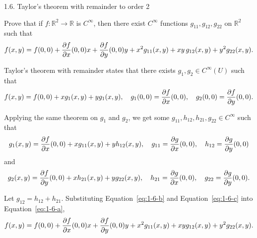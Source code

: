 \begin{problem}{1.6. Taylor's theorem with remainder to order 2}

Prove that if \( f : \mathbb{R}^2 \to \mathbb{R} \) is \( C^\infty \), then there exist \( C^\infty \) functions \( g_{11}, g_{12}, g_{22} \) on \( \mathbb{R}^2 \) such that
\[
    f(x, y) = f(0,0) + \frac{\partial f}{\partial x}(0,0) x + \frac{\partial f}{\partial y}(0,0) y + x^2 g_{11}(x, y) + xy\, g_{12}\/(x, y) + y^2 g_{22}\/(x, y).
\]
\end{problem}

Taylor's theorem with remainder states that there exists $g_1, g_2 \in C^{\infty} (U)$ such that 
\begin{equation} \label{eq:1-6-a}
    f(x, y) = f(0, 0) + xg_1(x, y) + yg_1(x, y), \quad g_1(0, 0) = \pdv{f}{x}\/(0, 0), \quad g_2\/(0, 0) = \pdv{f}{y}\/(0, 0) .
\end{equation}

Applying the same theorem on $g_1$ and $g_2$, we get some $g_{11}, h_{12}, h_{21}, g_{22} \in C^{\infty}$ such that
\begin{equation} \label{eq:1-6-b}
    g_1(x, y) = \pdv{f}{x}\/(0, 0) + xg_{11}(x,y) + yh_{12}(x, y), \quad g_{11} = \pdv{g}{x} \/(0, 0), \quad h_{12} = \pdv{g}{y} \/(0, 0)
\end{equation}
and
\begin{equation} \label{eq:1-6-c}
    g_2(x, y) = \pdv{f}{y}\/(0, 0) + xh_{21}(x,y) + yg_{22}(x, y), \quad h_{21} = \pdv{g}{x} \/(0, 0), \quad g_{22} = \pdv{g}{y} \/(0, 0) .
\end{equation}

Let $g_{12} = h_{12} + h_{21}$.
Substituting Equation~\ref{eq:1-6-b} and Equation~\ref{eq:1-6-c} into Equation~\ref{eq:1-6-a}, 
\begin{equation}
    f(x, y) = f(0, 0) + \pdv{f}{x}\/(0, 0)x + \pdv{f}{y}\/(0, 0)y + x^2g_{11}(x,y) + xyg_{12}(x, y) + y^2g_{22}(x, y) .
\end{equation}